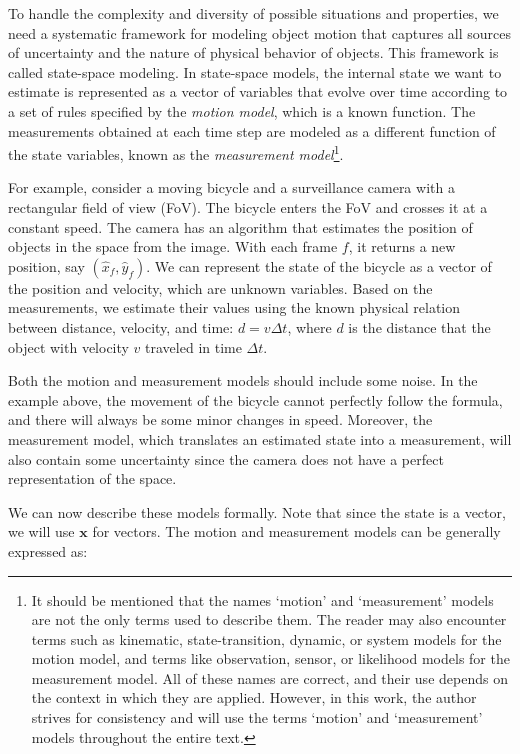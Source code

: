 To handle the complexity and diversity of possible situations and properties, 
we need a systematic framework for modeling object motion that captures all 
sources of uncertainty and the nature of physical behavior of objects. This 
framework is called state-space modeling. In state-space models, the internal 
state we want to estimate is represented as a vector of variables that evolve 
over time according to a set of rules specified by the \textit{motion model}, 
which is a known function. The measurements obtained at each time step are 
modeled as a different function of the state variables, known as the 
\textit{measurement model}\footnote{
    It should be mentioned that the names `motion' and `measurement' models are 
    not the only terms used to describe them. The reader may also encounter 
    terms such as kinematic, state-transition, dynamic, or system models for the 
    motion model, and terms like observation, sensor, or likelihood models for 
    the measurement model. All of these names are correct, and their use depends 
    on the context in which they are applied. However, in this work, the author 
    strives for consistency and will use the terms `motion' and `measurement' 
    models throughout the entire text.
}.

For example, consider a moving bicycle and a surveillance camera with a 
rectangular field of view (FoV). The bicycle enters the FoV and crosses it at a 
constant speed. The camera has an algorithm that estimates the position of 
objects in the space from the image. With each frame $f$, it returns a new 
position, say $(\hat x_f, \hat y_f)$. We can represent the state of the bicycle 
as a vector of the position and velocity, which are unknown variables. Based on 
the measurements, we estimate their values using the known physical relation 
between distance, velocity, and time: $d = v \Delta t$, where $d$ is the 
distance that the object with velocity $v$ traveled in time $\Delta t$.

Both the motion and measurement models should include some noise. In the 
example above, the movement of the bicycle cannot perfectly follow the formula, 
and there will always be some minor changes in speed. Moreover, the measurement 
model, which translates an estimated state into a measurement, will also 
contain some uncertainty since the camera does not have a perfect 
representation of the space.

We can now describe these models formally. Note that since the state is a 
vector, we will use $\mathbf{x}$ for vectors. The motion and measurement models 
can be generally expressed as:

